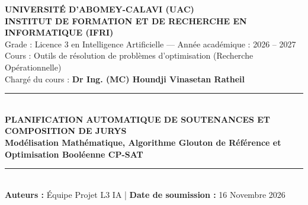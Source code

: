 \documentclass[10pt,a4paper]{article}
\begin{document}
\begin{center}
    {\large \textbf{UNIVERSITÉ D'ABOMEY-CALAVI (UAC)}}\\[0.15cm]
    {\large \textbf{INSTITUT DE FORMATION ET DE RECHERCHE EN INFORMATIQUE (IFRI)}}\\[0.25cm]
    {\small Grade : Licence 3 en Intelligence Artificielle --- Année académique : 2026 -- 2027}\\[0.15cm]
    {\small Cours : Outils de résolution de problèmes d'optimisation (Recherche Opérationnelle)}\\[0.15cm]
    {\small Chargé du cours : \textbf{Dr Ing. (MC) Houndji Vinasetan Ratheil}}\\[0.6cm]
    
    \rule{\linewidth}{1.2pt}\\[0.35cm]
    {\LARGE \bfseries \color{darkblue} PLANIFICATION AUTOMATIQUE DE SOUTENANCES ET COMPOSITION DE JURYS}\\[0.25cm]
    {\large \bfseries \color{primary} Modélisation Mathématique, Algorithme Glouton de Référence et Optimisation Booléenne CP-SAT}\\[0.35cm]
    \rule{\linewidth}{1.2pt}\\[0.6cm]
    
    \textbf{Auteurs :} Équipe Projet L3 IA \quad | \quad \textbf{Date de soumission :} 16 Novembre 2026
\end{center}

\vspace{0.3cm}
\begin{abstract}
\noindent Ce rapport documente l'étude théorique, l'implémentation algorithmique et l'évaluation expérimentale du problème d'ordonnancement et de composition de jurys de soutenances académiques pour l'IFRI / UAC. Nous formalisons rigoureusement l'ensemble des contraintes impératives (A.0 à D.2) ainsi que les cinq critères de qualité du cahier des charges ($f_1$ à $f_5$). Deux approches complémentaires sont conçues : une méthode de référence gloutonne (Baseline) fondée sur l'heuristique MRV, l'équilibrage dynamique de charge et une réparation locale, et une méthode d'optimisation exacte reposant sur la programmation par contraintes booléenne (\textbf{Google OR-Tools CP-SAT}). Une campagne expérimentale systématique menée sur les 30 instances officielles (12 à 136 étudiants) sous un budget strict de 60 secondes et 5 graines aléatoires démontre un taux de faisabilité de \textbf{100\%} pour les deux méthodes (180 solutions valides vérifiées par le validateur officiel). L'approche CP-SAT apporte des gains substantiels sur les petites et moyennes instances (jusqu'à $+28{,}6\%$ sur la compacité des séries d'encadrement $f_4$ et $+6{,}5\%$ sur la présence enseignante $f_1$), tout en illustrant les compromis inhérents aux problèmes fortement contraints et les défis combinatoires sur les grands horizons.
\end{abstract}
\end{document}
